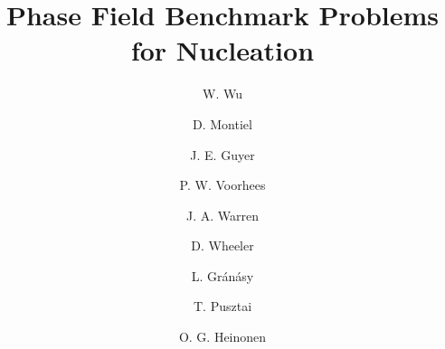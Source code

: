 \documentclass[preprint,12pt]{elsarticle}
\begin{document}
\begin{frontmatter}

\title{Phase Field Benchmark Problems for Nucleation}

\author[CHiMaD,ANL-2]{W. Wu}

\author[UM]{D. Montiel}

\author[NIST]{J. E. Guyer}

\author[CHiMaD,NU]{P. W. Voorhees}

\author[NIST]{J. A. Warren}

\author[NIST]{D. Wheeler}

\author[Wigner]{L. Gr\'{a}n\'{a}sy}

\author[Wigner]{T. Pusztai}

\author[ANL-2,NAISE]{O. G. Heinonen}


\address[CHiMaD]{Center for Hierarchical Materials Design, Northwestern University, 2205 Tech Drive, Suite 1160, Evanston, IL, 60208, USA}
\address[ANL-2]{Materials Science Division, Argonne National Laboratory, 9700 South Cass Avenue, Lemont, IL 60439, USA}
\address[UM]{Department of Materials Science and Engineering, University of Michigan, 2300 Hayward Street, Ann Arbor, MI, 48109, USA}
\address[NIST]{Material Measurement Laboratory, National Institute of Standards and Technology, 100 Bureau Drive, MS 8300, Gaithersburg, MD 20899-8300, USA}
\address[NAISE]{Northwestern-Argonne Institute of Science and Engineering, 2205 Tech Drive, Suite 1160, Evanston, Illinois 60208, USA}
\address[NU]{Department of Materials Science and Engineering, Northwestern University, 2220 Campus Drive, Evanston, IL 60208, USA}
\address[Wigner]{Department of Experimental Solid State Physics, Institute for Solid State Physics and Optics, Wigner Research Centre for Physics, 29-33, Konkoly-Thege Mikl\'{o}s \'{u}t, Budapest, Hungary, H-1121}


\end{frontmatter}
\end{document}
